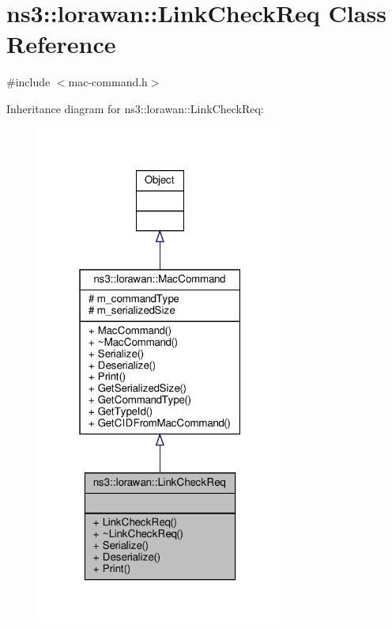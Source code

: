 \hypertarget{classns3_1_1lorawan_1_1LinkCheckReq}{}\section{ns3\+:\+:lorawan\+:\+:Link\+Check\+Req Class Reference}
\label{classns3_1_1lorawan_1_1LinkCheckReq}


{\ttfamily \#include $<$mac-\/command.\+h$>$}



Inheritance diagram for ns3\+:\+:lorawan\+:\+:Link\+Check\+Req\+:
\nopagebreak
\begin{figure}[H]
\begin{center}
\leavevmode
\includegraphics[width=232pt]{classns3_1_1lorawan_1_1LinkCheckReq__inherit__graph}
\end{center}
\end{figure}


